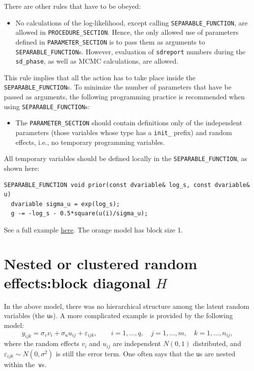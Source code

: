 \documentclass{admbmanual}
\begin{document}
There are other rules that have to be obeyed:
\begin{itemize}
  \item[$\bigstar$] No calculations of the log-likelihood, except calling
  \texttt{SEPARABLE\_FUNCTION}, are allowed in \texttt{PROCEDURE\_SECTION}.
  Hence, the only allowed use of parameters defined in
  \texttt{PARAMETER\_SECTION} is to pass them as arguments to
  \texttt{SEPARABLE\_FUNCTION}s. However, evaluation of \texttt{sdreport}
  numbers during the \texttt{sd\_phase}, as well as MCMC calculations, are
  allowed.
\end{itemize}
This rule implies that all the action has to take place inside the
\texttt{SEPARABLE\_FUNCTION}s. To minimize the number of parameters that have be
passed as arguments, the following programming practice is recommended when
using \texttt{SEPARABLE\_FUNCTION}s:
\begin{itemize}
  \item[$\bigstar$] The \texttt{PARAMETER\_SECTION} should contain definitions
  only of the independent parameters (those variables whose type has a
  \texttt{init\_} prefix) and random effects, i.e., no temporary programming
  variables.
\end{itemize}
All temporary variables should be defined locally in the
\texttt{SEPARABLE\_FUNCTION}, as shown here:
\begin{lstlisting}
SEPARABLE_FUNCTION void prior(const dvariable& log_s, const dvariable& u)
  dvariable sigma_u = exp(log_s);
  g -= -log_s - 0.5*square(u(i)/sigma_u);
\end{lstlisting}

See a full example
\href{http://www.admb-project.org/otter-research/admbre/examples/orange/orange.html}{here}. The
orange model has block size 1.

\section{Nested or clustered random effects:\br block diagonal $H$}
\label{sec:nested}

In the above model, there was no hierarchical structure among the latent random
variables (the \texttt{u}s). A more complicated example is provided by the
following model:
\[
y_{ijk}= \sigma_v v_i + \sigma_u u_{ij}+\varepsilon_{ijk},
\qquad i=1,\ldots,q,\quad j=1,\ldots,m,\quad k=1,\ldots,n_{ij},
\]
where the random effects $v_i$ and $u_{ij}$ are independent
$N(0,1)$ distributed, and $\varepsilon_{ijk}\sim N(0,\sigma^2)$ is still the
error term. One often says that the \texttt{u}s are nested within
the~\texttt{v}s.
\end{document}
